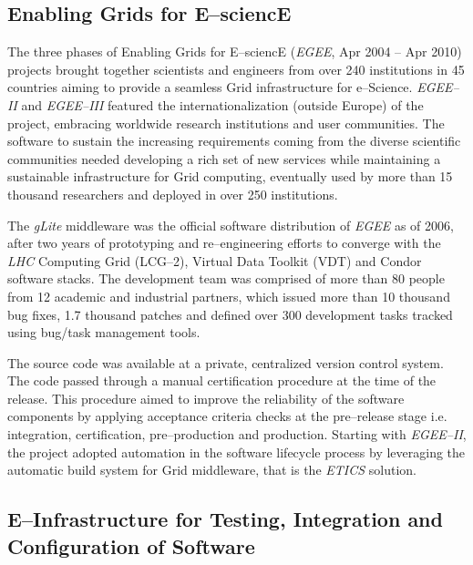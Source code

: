 \documentclass[journal]{IEEEtran}
\begin{document}
\subsection{Enabling Grids for E--sciencE}
The three phases of Enabling Grids for E--sciencE ({\sl EGEE}, Apr 2004 -- Apr 2010)
\cite{cordis:egee,cordis:egee2,cordis:egee3} projects brought together
scientists and engineers from over 240 institutions in 45 countries aiming to
provide a seamless Grid infrastructure for e--Science. {\sl EGEE--II} and {\sl EGEE--III}
featured the internationalization (outside Europe) of the project, embracing worldwide research
institutions and user communities. The software to sustain the increasing
requirements coming from the diverse scientific communities needed developing a
rich set of new services while maintaining a sustainable infrastructure for
Grid computing, eventually used by more than 15 thousand researchers and deployed in
over 250 institutions.

The {\sl gLite} middleware \cite{glite} was the
official software distribution of {\sl EGEE} as of 2006, after two years of prototyping and
re--engineering efforts to converge with the {\sl LHC} Computing Grid (LCG--2), Virtual
Data Toolkit (VDT) and Condor \cite{condor} software stacks. The
development team was comprised of more than 80 people from 12 academic and
industrial partners, which issued more than 10 thousand bug fixes, 1.7 thousand patches and
defined over 300 development tasks tracked using bug/task management tools.

The source code was available at a private, centralized version control system.
The code passed through a manual certification procedure at the time of the release.
This procedure aimed to improve the reliability of the software components by applying
acceptance criteria checks at the pre--release stage
\cite{egee:acceptance-criteria} i.e. integration, certification, pre--production and
production. Starting with {\sl EGEE--II}, the project adopted automation in the software
lifecycle process by leveraging the automatic build system for Grid middleware, that is
the {\sl ETICS} \cite{etics} solution.

\subsection{E--Infrastructure for Testing, Integration and Configuration of Software}
\end{document}
